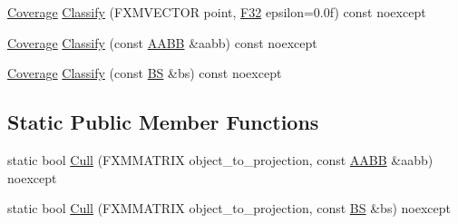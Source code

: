 \begin{DoxyCompactItemize}
\item 
\hyperlink{namespacemage_aa9fe157e5a578a103160266df8cccb0a}{Coverage} \hyperlink{structmage_1_1_view_frustum_adb125f6696034c543a900f9924a3541f}{Classify} (F\+X\+M\+V\+E\+C\+T\+OR point, \hyperlink{namespacemage_aa97e833b45f06d60a0a9c4fc22ae02c0}{F32} epsilon=0.\+0f) const noexcept
\item 
\hyperlink{namespacemage_aa9fe157e5a578a103160266df8cccb0a}{Coverage} \hyperlink{structmage_1_1_view_frustum_a2c8ac9e080897aa02902d383e64a50e7}{Classify} (const \hyperlink{structmage_1_1_a_a_b_b}{A\+A\+BB} \&aabb) const noexcept
\item 
\hyperlink{namespacemage_aa9fe157e5a578a103160266df8cccb0a}{Coverage} \hyperlink{structmage_1_1_view_frustum_ad614c4948b6a99174d9aeac5dd5825f5}{Classify} (const \hyperlink{structmage_1_1_b_s}{BS} \&bs) const noexcept
\end{DoxyCompactItemize}
\subsection*{Static Public Member Functions}
\begin{DoxyCompactItemize}
\item 
static bool \hyperlink{structmage_1_1_view_frustum_a426fbed6bc71bd195edda01e5c3b2c3f}{Cull} (F\+X\+M\+M\+A\+T\+R\+IX object\+\_\+to\+\_\+projection, const \hyperlink{structmage_1_1_a_a_b_b}{A\+A\+BB} \&aabb) noexcept
\item 
static bool \hyperlink{structmage_1_1_view_frustum_ae07812a46d8c5058267a35b154b603c5}{Cull} (F\+X\+M\+M\+A\+T\+R\+IX object\+\_\+to\+\_\+projection, const \hyperlink{structmage_1_1_b_s}{BS} \&bs) noexcept
\end{DoxyCompactItemize}
